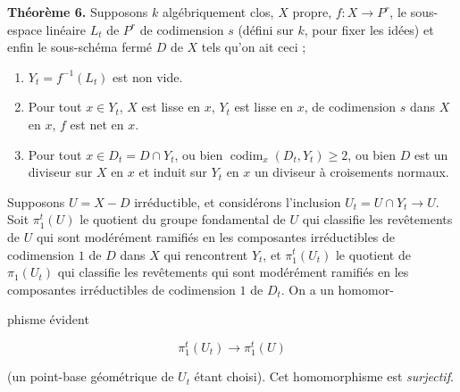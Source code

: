 \documentclass[11pt,a4paper]{article}
\begin{document}
\textbf{Théorème 6.} Supposons $k$ algébriquement clos, $X$ propre, $f : X \to
P^{r}$,  le sous-espace linéaire $L_{t}$ de $P^{r}$ de codimension $s$
(défini sur $k$, pour fixer les idées) \struck{\ill{}} et enfin le sous-schéma
fermé $D$ de $X$ tels qu'on ait ceci ; \struck{\ill{}}

\begin{enumerate}
\item[a)] \struck{\ill{}} $Y_{t} = f^{-1}(L_{t})$ est non vide.

\item[b)] Pour tout $x \in Y_{t}$, $X$ est lisse en $x$, $Y_{t}$ est lisse en
$x$, de codimension $s$ dans $X$ en $x$, $f$ est net en $x$.

\item[c)] Pour tout $x \in D_{t} = D \cap Y_{t}$, ou bien
$\operatorname{codim}_{x}(D_{t}, Y_{t}) \geqslant 2$, ou bien $D$ est un
diviseur sur $X$ en $x$ et induit sur $Y_{t}$ en $x$ un diviseur à croisements
normaux.
\end{enumerate}

Supposons $U = X - D$ irréductible, et considérons l'inclusion $U_{t} = U \cap
Y_{t} \to U$. \struck{\ill{}} Soit $\pi_{1}^{t}(U)$ le \struck{\ill{}} quotient
du groupe fondamental de $U$ \struck{\ill{}} qui classifie les revêtements de
$U$ qui sont modérément ramifiés en les composantes irréductibles de
codimension $1$ de $D$ dans $X$ qui rencontrent $Y_{t}$, \struck{\ill{}} et
$\pi_{1}^{t}(U_{t})$ le quotient  de $\pi_{1}(U_{t})$ qui
classifie les revêtements qui sont modérément ramifiés en les composantes
irréductibles de codimension $1$ de $D_{t}$. On a un homomor-


phisme évident

\[ \pi_{1}^{t}(U_{t}) \longrightarrow \pi_{1}^{t}(U) \]

(un point-base géométrique de $U_{t}$ étant choisi). Cet homomorphisme est
\emph{surjectif}.
\end{document}
